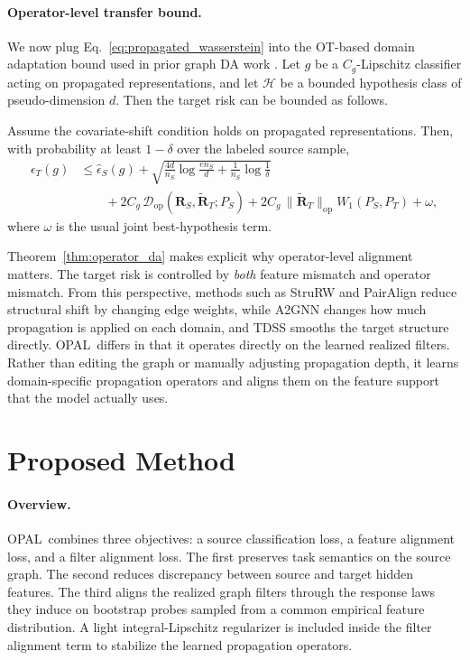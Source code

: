 \documentclass[runningheads]{llncs}
\newcommand{\model}{OPAL}
\def\sH{{\mathcal{H}}}
\def\mR{{\mathbf{R}}}
\begin{document}
\paragraph{Operator-level transfer bound.}
We now plug Eq.~\eqref{eq:propagated_wasserstein} into the OT-based domain adaptation bound used in prior graph DA work \cite{ot_da,specreg}. Let $g$ be a $C_g$-Lipschitz classifier acting on propagated representations, and let $\sH$ be a bounded hypothesis class of pseudo-dimension $d$. Then the target risk can be bounded as follows.

\begin{theorem}
\label{thm:operator_da}
Assume the covariate-shift condition holds on propagated representations. Then, with probability at least $1-\delta$ over the labeled source sample,
\begin{align}
\epsilon_T(g)
&\le
\widehat\epsilon_S(g)
+
\sqrt{
\frac{4d}{n_S}\log\frac{en_S}{d}
+
\frac{1}{n_S}\log\frac{1}{\delta}
}
\nonumber\\
&\qquad
+2C_g\,\mathcal D_{\mathrm{op}}(\mR_S,\widetilde{\mR}_T;P_S)
+2C_g\,\|\widetilde{\mR}_T\|_{\mathrm{op}}W_1(P_S,P_T)
+\omega,
\label{eq:operator_da_bound}
\end{align}
where $\omega$ is the usual joint best-hypothesis term.
\end{theorem}

Theorem~\ref{thm:operator_da} makes explicit why operator-level alignment matters. The target risk is controlled by \emph{both} feature mismatch and operator mismatch. From this perspective, methods such as StruRW and PairAlign reduce structural shift by changing edge weights, while A2GNN changes how much propagation is applied on each domain, and TDSS smooths the target structure directly. \model\ differs in that it operates directly on the learned realized filters. Rather than editing the graph or manually adjusting propagation depth, it learns domain-specific propagation operators and aligns them on the feature support that the model actually uses.

\section{Proposed Method}

\paragraph{Overview.}
\model\ combines three objectives: a source classification loss, a feature alignment loss, and a filter alignment loss. The first preserves task semantics on the source graph. The second reduces discrepancy between source and target hidden features. The third aligns the realized graph filters through the response laws they induce on bootstrap probes sampled from a common empirical feature distribution. A light integral-Lipschitz regularizer is included inside the filter alignment term to stabilize the learned propagation operators.
\end{document}
